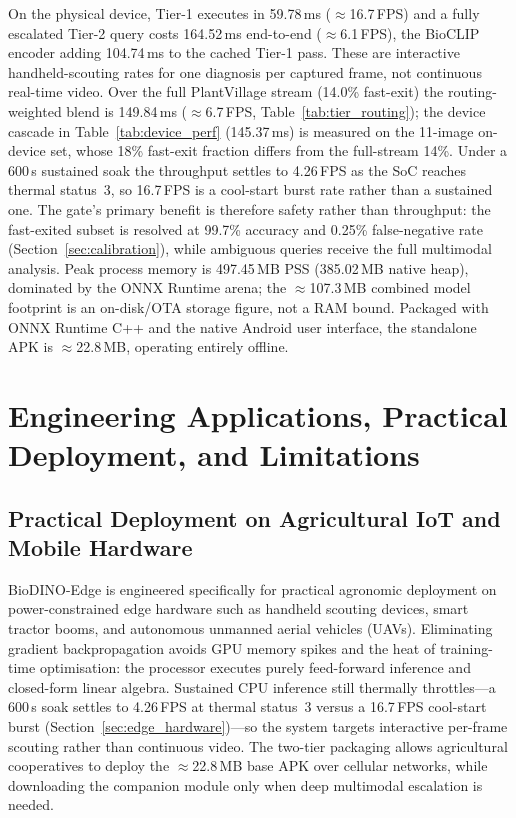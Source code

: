 \documentclass[preprint,12pt]{elsarticle}
\begin{document}
On the physical device, Tier-1 executes in 59.78\,ms ($\approx$16.7\,FPS) and a fully escalated Tier-2 query costs 164.52\,ms end-to-end ($\approx$6.1\,FPS), the BioCLIP encoder adding 104.74\,ms to the cached Tier-1 pass. These are interactive handheld-scouting rates for one diagnosis per captured frame, not continuous real-time video. Over the full PlantVillage stream (14.0\% fast-exit) the routing-weighted blend is 149.84\,ms ($\approx$6.7\,FPS, Table~\ref{tab:tier_routing}); the device cascade in Table~\ref{tab:device_perf} (145.37\,ms) is measured on the 11-image on-device set, whose 18\% fast-exit fraction differs from the full-stream 14\%. Under a 600\,s sustained soak the throughput settles to 4.26\,FPS as the SoC reaches thermal status~3, so 16.7\,FPS is a cool-start burst rate rather than a sustained one. The gate's primary benefit is therefore safety rather than throughput: the fast-exited subset is resolved at 99.7\% accuracy and 0.25\% false-negative rate (Section~\ref{sec:calibration}), while ambiguous queries receive the full multimodal analysis. Peak process memory is 497.45\,MB PSS (385.02\,MB native heap), dominated by the ONNX Runtime arena; the $\approx$107.3\,MB combined model footprint is an on-disk/OTA storage figure, not a RAM bound. Packaged with ONNX Runtime C++ and the native Android user interface, the standalone APK is $\approx$22.8\,MB, operating entirely offline.

\section{Engineering Applications, Practical Deployment, and Limitations}
\label{sec:discussion}

\subsection{Practical Deployment on Agricultural IoT and Mobile Hardware}
BioDINO-Edge is engineered specifically for practical agronomic deployment on power-constrained edge hardware such as handheld scouting devices, smart tractor booms, and autonomous unmanned aerial vehicles (UAVs). Eliminating gradient backpropagation avoids GPU memory spikes and the heat of training-time optimisation: the processor executes purely feed-forward inference and closed-form linear algebra. Sustained CPU inference still thermally throttles---a 600\,s soak settles to 4.26\,FPS at thermal status~3 versus a 16.7\,FPS cool-start burst (Section~\ref{sec:edge_hardware})---so the system targets interactive per-frame scouting rather than continuous video. The two-tier packaging allows agricultural cooperatives to deploy the $\approx$22.8\,MB base APK over cellular networks, while downloading the companion module only when deep multimodal escalation is needed.
\end{document}
